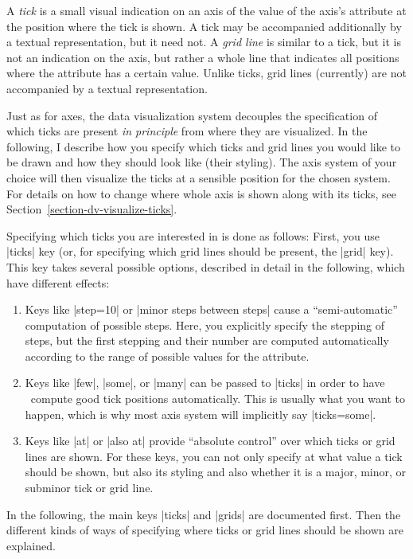 A \emph{tick} is a small visual indication on an axis of the value of
the axis's attribute at the position where the tick is shown. A tick
may be accompanied additionally by a textual representation, but it
need not. A \emph{grid line} is similar to a tick, but it is not an
indication on the axis, but rather a whole line that indicates all
positions where the attribute has a certain value. Unlike ticks,
grid lines (currently) are not accompanied by a textual
representation.

Just as for axes, the data visualization system decouples the
specification of which ticks are present \emph{in principle} from
where they are visualized. In the following, I describe how you
specify which ticks and grid lines you would like to be drawn and how
they should look like (their styling). The axis system of your choice
will then visualize the ticks at a sensible position for the chosen
system. For details on how to change where whole axis is shown along
with its ticks, see Section~\ref{section-dv-visualize-ticks}. 

Specifying which ticks you are interested in is done as follows:
First, you use |ticks| key (or, for specifying which grid lines  should
be present, the |grid| key). This key takes several possible options,
described in detail in the following, which have different effects:
\begin{enumerate}
\item Keys like |step=10| or |minor steps between steps| cause a
  ``semi-automatic'' computation of possible steps. Here, you
  explicitly specify the stepping of steps, but the first stepping and
  their number are computed automatically according to the range of
  possible values for the attribute.
\item Keys like |few|, |some|, or |many| can be passed to |ticks| in
  order to have \tikzname\ compute good tick positions
  automatically. This is usually what you want to happen, which is why
  most axis system will implicitly say |ticks={some}|.
\item Keys like |at| or |also at| provide ``absolute control'' over
  which ticks or grid lines are shown. For these keys, you can not only
  specify at what value a tick should be shown, but also its styling
  and also whether it is a major, minor, or subminor tick or grid line.
\end{enumerate}

In the following, the main keys |ticks| and |grids| are documented
first. Then the different kinds of ways of specifying where ticks or
grid lines should be shown are explained.  


